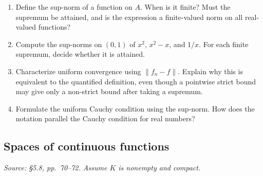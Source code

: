 \begin{enumerate}[resume]
  \item Define the sup-norm of a function on \(A\).
    When is it finite? Must the supremum be attained, and is the
    expression a finite-valued norm on all real-valued functions?

  \item Compute the sup-norms on \((0,1)\) of \(x^2\), \(x^2-x\),
    and \(1/x\). For each finite supremum, decide whether it is attained.

  \item Characterize uniform convergence using \(\|f_n-f\|\).
    Explain why this is equivalent to the quantified definition,
    even though a pointwise strict bound may give only a non-strict
    bound after taking a supremum.

  \item Formulate the uniform Cauchy condition using the sup-norm.
    How does the notation parallel the Cauchy condition for real numbers?
\end{enumerate}

\subsection{Spaces of continuous functions}
\textit{Source: \S5.8, pp.~70--72. Assume \(K\) is nonempty and compact.}

